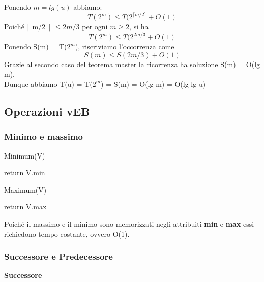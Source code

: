 \documentclass{article}
\begin{document}
    Ponendo $m = lg (u)$ abbiamo:
    \begin{equation}
        T(2^m) \leq T(2^{\lceil m/2 \rceil} +O(1)
    \end{equation}
    Poiché $\lceil$ m/2 $\rceil$ $\leq 2m/3$ per ogni $m \ge 2$, si ha
    \begin{equation}
        T(2^m) \leq T(2^{2m/3} + O(1)
    \end{equation}
    Ponendo S(m) = T($2^m$), riscriviamo l'occorrenza come
    \begin{equation}
        S(m) \leq S(2m/3) + O(1)
    \end{equation}
    Grazie al secondo caso del teorema master la ricorrenza ha soluzione S(m) = O(lg m).\\
    Dunque abbiamo T(u) = T($2^m$) = S(m) = O(lg m) = O(lg lg u)
    

    \subsection{Operazioni vEB}
    
        \subsubsection{Minimo e massimo}
            \begin{algorithm}
                \caption{Minimum(V)}
                    {return V.min}
            \end{algorithm}
           \begin{algorithm}
                \caption{Maximum(V)}
                    {return V.max}
            \end{algorithm}
            
            Poiché il massimo e il minimo sono memorizzati negli attribuiti \textbf{min} e \textbf{max} essi richiedono tempo costante, ovvero O(1).
        
        \subsubsection{Successore e Predecessore}
            \textbf{Successore}\\
            
\end{document}
